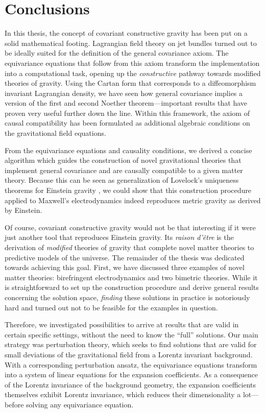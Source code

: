 \chapter{Conclusions}

In this thesis, the concept of covariant constructive gravity has been put on a solid mathematical footing. Lagrangian field theory on jet bundles turned out to be ideally suited for the definition of the general covariance axiom. The equivariance equations that follow from this axiom transform the implementation into a computational task, opening up the \emph{constructive} pathway towards modified theories of gravity. Using the Cartan form that corresponds to a diffeomorphism invariant Lagrangian density, we have seen how general covariance implies a version of the first and second Noether theorem---important results that have proven very useful further down the line. Within this framework, the axiom of causal compatibility has been formulated as additional algebraic conditions on the gravitational field equations.

From the equivariance equations and causality conditions, we derived a concise algorithm which guides the construction of novel gravitational theories that implement general covariance and are causally compatible to a given matter theory. Because this can be seen as generalization of Lovelock's uniqueness theorems for Einstein gravity \cite{Lovelock_1969,Lovelock_1971,Lovelock_1972}, we could show that this construction procedure applied to Maxwell's electrodynamics indeed reproduces metric gravity as derived by Einstein.

Of course, covariant constructive gravity would not be that interesting if it were just another tool that reproduces Einstein gravity. Its \emph{raison d'\^etre} is the derivation of \emph{modified} theories of gravity that complete novel matter theories to predictive models of the universe. The remainder of the thesis was dedicated towards achieving this goal. First, we have discussed three examples of novel matter theories: birefringent electrodynamics and two bimetric theories. While it is straightforward to set up the construction procedure and derive general results concerning the solution space, \emph{finding} these solutions in practice is notoriously hard and turned out not to be feasible for the examples in question.

Therefore, we investigated possibilities to arrive at results that are valid in certain specific settings, without the need to know the ``full'' solutions. Our main strategy was perturbation theory, which seeks to find solutions that are valid for small deviations of the gravitational field from a Lorentz invariant background. With a corresponding perturbation ansatz, the equivariance equations transform into a system of linear equations for the expansion coefficients. As a consequence of the Lorentz invariance of the background geometry, the expansion coefficients themselves exhibit Lorentz invariance, which reduces their dimensionality a lot---before solving any equivariance equation.

